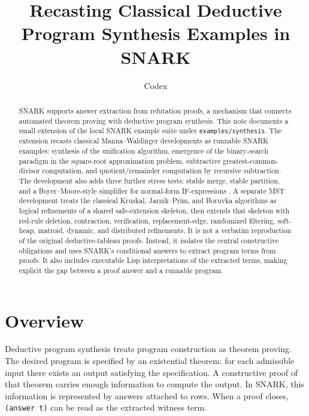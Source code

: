\documentclass[runningheads]{llncs}
\title{Recasting Classical Deductive Program Synthesis Examples in SNARK}
\author{Codex}
\institute{SNARK workspace notes, \url{https://github.com/nilqed/SNARK}}
\begin{document}
\maketitle

\begin{abstract}
SNARK supports answer extraction from refutation proofs, a mechanism that
connects automated theorem proving with deductive program synthesis.  This note
documents a small extension of the local SNARK example suite under
\texttt{examples/synthesis}.  The extension recasts classical
Manna--Waldinger developments as runnable SNARK examples: synthesis of the
unification algorithm, emergence of the binary-search paradigm in the
square-root approximation problem, subtractive greatest-common-divisor
computation, and quotient/remainder computation by recursive subtraction.  The
development also adds three further stress tests: stable merge, stable
partition, and a Boyer--Moore-style simplifier for normal-form IF-expressions
\cite{BoyerMoore1979}.  A separate MST development treats the classical
Kruskal, Jarnik--Prim, and Boruvka algorithms
\cite{Kruskal1956,Jarnik1930,Prim1957,Boruvka1926} as logical refinements of
a shared safe-extension skeleton, then extends that skeleton with red-rule
deletion, contraction, verification, replacement-edge, randomized filtering,
soft-heap, matroid, dynamic, and distributed refinements.  It is not a verbatim
reproduction of the original deductive-tableau proofs.  Instead, it isolates
the central constructive obligations and uses SNARK's conditional answers to
extract program terms from proofs.  It also includes executable Lisp
interpretations of the extracted terms, making explicit the gap between a proof
answer and a runnable program.

\end{abstract}

\section{Overview}

Deductive program synthesis treats program construction as theorem proving.
The desired program is specified by an existential theorem: for each admissible
input there exists an output satisfying the specification.  A constructive
proof of that theorem carries enough information to compute the output.  In
SNARK, this information is represented by answers attached to rows.  When a
proof closes, \texttt{(answer t)} can be read as the extracted witness term.
\end{document}
